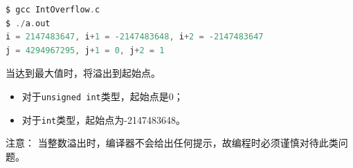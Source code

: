 \begin{frame}[fragile]

\end{frame}
%
\begin{frame}[fragile]

\begin{lstlisting}[language=c]
$ gcc IntOverflow.c
$ ./a.out
i = 2147483647, i+1 = -2147483648, i+2 = -2147483647
j = 4294967295, j+1 = 0, j+2 = 1
\end{lstlisting}
\end{frame}
%
\begin{frame}[fragile]

当达到最大值时，将溢出到起始点。\vspace{0.05in}
\begin{itemize}
\item 对于\lstinline|unsigned int|类型，起始点是0；\\[0.1in]
\item 对于\lstinline|int|类型，起始点为-2147483648。
\end{itemize}

\vspace{0.1in}
 注意： 当整数溢出时，编译器不会给出任何提示，故编程时必须谨慎对待此类问题。 

\end{frame}
